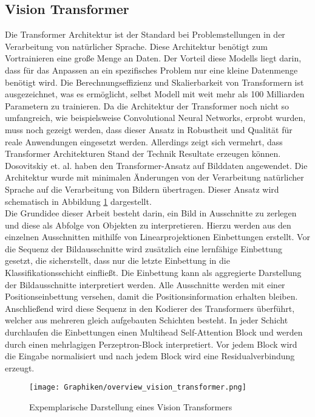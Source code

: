 \subsection{Vision Transformer}
\label{sec:ViT}

Die Transformer Architektur \cite{Transformer_Vaswani2017} ist der Standard bei Problemstellungen in der Verarbeitung von natürlicher Sprache. Diese Architektur benötigt zum Vortrainieren eine große Menge an Daten. Der Vorteil diese Modells liegt darin, dass für das Anpassen an ein spezifisches Problem nur eine kleine Datenmenge benötigt wird. Die Berechnungseffizienz und Skalierbarkeit von Transformern ist ausgezeichnet, was es ermöglicht, selbst Modell mit weit mehr als 100 Milliarden Parametern zu trainieren. Da die Architektur der Transformer noch nicht so umfangreich, wie beispielsweise Convolutional Neural Networks, erprobt wurden, muss noch gezeigt werden, dass dieser Ansatz in Robustheit und Qualität für reale Anwendungen eingesetzt werden. Allerdings zeigt sich vermehrt, dass Transformer Architekturen Stand der Technik Resultate erzeugen können\cite{stateOfTheArt_Mo_2022}. \\
Dosovitskiy et. al. \cite{ViTdosovitskiy2021image} haben den Transformer-Ansatz auf Bilddaten angewendet. Die Architektur wurde mit minimalen Änderungen von der Verarbeitung natürlicher Sprache auf die Verarbeitung von Bildern übertragen. Dieser Ansatz wird schematisch in Abbildung \ref{fig:ViT} dargestellt. \\
Die Grundidee dieser Arbeit besteht darin, ein Bild in Ausschnitte zu zerlegen und diese als Abfolge von Objekten zu interpretieren. Hierzu werden aus den einzelnen Ausschnitten mithilfe von Linearprojektionen Einbettungen erstellt. Vor die Sequenz der Bildausschnitte wird zusätzlich eine lernfähige Einbettung gesetzt, die sicherstellt, dass nur die letzte Einbettung in die Klassifikationsschicht einfließt. Die Einbettung kann als aggregierte Darstellung der Bildausschnitte interpretiert werden. Alle Ausschnitte werden mit einer Positionseinbettung versehen, damit die Positionsinformation erhalten bleiben. Anschließend wird diese Sequenz in den Kodierer des Transformers überführt, welcher aus mehreren gleich aufgebauten Schichten besteht. In jeder Schicht durchlaufen die Einbettungen einen Multihead Self-Attention Block und werden durch einen mehrlagigen Perzeptron-Block interpretiert. Vor jedem Block wird die Eingabe normalisiert und nach jedem Block wird eine Residualverbindung erzeugt.


\begin{figure}[!h]
	\centering
	\texttt{[image: Graphiken/overview\_vision\_transformer.png]}
	\caption{Expemplarische Darstellung eines Vision Transformers \cite{ViTdosovitskiy2021image}}
	\label{fig:ViT}
\end{figure}

